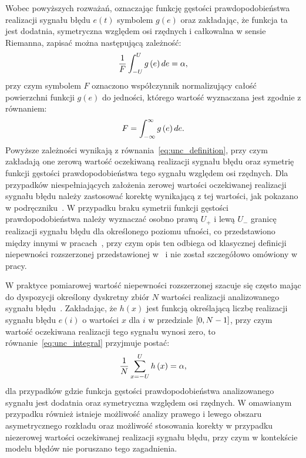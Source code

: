 Wobec powyższych rozważań, oznaczając funkcję gęstości prawdopodobieństwa realizacji sygnału błędu $e(t)$ symbolem $g(e)$ oraz zakładając, że funkcja ta jest dodatnia, symetryczna względem osi rzędnych i całkowalna w sensie Riemanna, zapisać można następującą zależność:
\begin{equation}
\frac{1}{F} \int _{-U} ^{U} g \left(e\right) de = \alpha \label{eq:unc_integral},
\end{equation}
przy czym symbolem $F$ oznaczono współczynnik normalizujący całość powierzchni funkcji $g(e)$ do jedności, którego wartość wyznaczana jest zgodnie z równaniem:
\begin{equation}
F = \int _{-\infty} ^{\infty} g \left(e\right) de \label{eq:unc_normalizer_int}.
\end{equation}
Powyższe zależności wynikają z równania~\eqref{eq:unc_definition}, przy czym zakładają one zerową wartość oczekiwaną realizacji sygnału błędu oraz symetrię funkcji gęstości prawdopodobieństwa tego sygnału względem osi rzędnych. Dla przypadków niespełniających założenia zerowej wartości oczekiwanej realizacji sygnału błędu należy zastosować korektę wynikającą z tej wartości, jak pokazano w podręczniku~\cite{jakubiec_system}. W przypadku braku symetrii funkcji gęstości prawdopodobieństwa należy wyznaczać osobno prawą $U_{+}$ i lewą $U_{-}$ granicę realizacji sygnału błędu dla określonego poziomu ufności, co przedstawiono między innymi w pracach~\cite{roj_annuncertainty, wymyslo_range}, przy czym opis ten odbiega od klasycznej definicji niepewności rozszerzonej przedstawionej w~\cite{jcgm_guide} i nie został szczegółowo omówiony w pracy.

W praktyce pomiarowej wartość niepewności rozszerzonej szacuje się często mając do dyspozycji określony dyskretny zbiór $N$ wartości realizacji analizowanego sygnału błędu~\cite{jcgm_guide}. Zakładając, że $h(x)$ jest funkcją określającą liczbę realizacji sygnału błędu $e(i)$ o wartości $x$ dla $i$ w przedziale  $\interval{0}{N-1}$, przy czym wartość oczekiwana realizacji tego sygnału wynosi zero, to równanie~\eqref{eq:unc_integral} przyjmuje postać:
\begin{equation}
\frac{1}{N} \sum _{x=-U} ^{U} h \left(x\right) = \alpha \label{eq:unc_summation},
\end{equation}
dla przypadków gdzie funkcja gęstości prawdopodobieństwa analizowanego sygnału jest dodatnia oraz symetryczna względem osi rzędnych. W omawianym przypadku również istnieje możliwość analizy prawego i lewego obszaru asymetrycznego rozkładu oraz możliwość stosowania korekty w przypadku niezerowej wartości oczekiwanej realizacji sygnału błędu, przy czym w kontekście modelu błędów nie poruszano tego zagadnienia.

